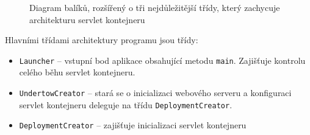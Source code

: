            \begin{figure}[h!t]
                \begin{center}
                    \caption{Diagram balíků, rozšířený o tři nejdůležitější třídy, který zachycuje architekturu servlet kontejneru}
                    \label{imgPackage}
                \end{center}
            \end{figure}

            Hlavními třídami architektury programu jsou třídy:
            \begin{itemize}
                \item \texttt{Launcher} -- vstupní bod aplikace obsahující metodu \texttt{main}. 
                    Zajišťuje kontrolu celého běhu servlet kontejneru. 

                \item \texttt{UndertowCreator} -- stará se o inicializaci webového serveru
                    a konfiguraci servlet kontejneru deleguje na třídu \texttt{DeploymentCreator}.

                \item \texttt{DeploymentCreator} -- zajišťuje inicializaci servlet kontejneru 
            \end{itemize}


